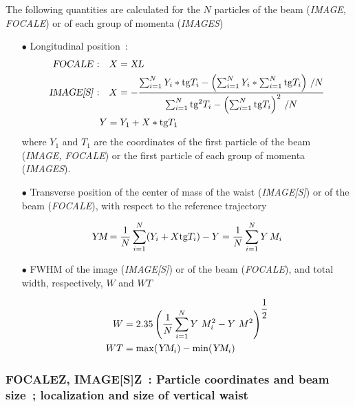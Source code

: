 \noindent The following quantities are calculated for the $ N $ particles of
the beam (\textsl{IMAGE,   FOCALE}) or of each group    of momenta 
(\textsl{IMAGES})  
\medskip

\begin{itemize}
\item[$\bullet$]Longitudinal position~: 
       \begin{align*}
       \text{\textsl{FOCALE}~:} & \quad  X=\XL  \\
       \text{\textsl{IMAGE[S]}~:} & \quad   X    = - 
    \dfrac{ \sum^ N_{i=1}Y_i\ast \text{tg} T_i- 
         \left( \sum^ N_{i=1}Y_i\ast \sum^N_{i=1}\text{tg} T_i \right)\, /N }{%
        \sum^ N_{i=1}\text{tg} ^2T_i- \left( \sum^ N_{i=1}\text{tg} T_i\right)^2\, /N} \\ 
            & Y   =   Y_1+X  \ast   \text{tg} T_1  
        \end{align*}    
where $ Y_1 $ and $ T_1 $ are the coordinates of the first particle
of the beam (\textsl{IMAGE, FOCALE}) or the first particle of each group of momenta 
(\textsl{IMAGES}). 

\item[$\bullet$]Transverse position of the center of mass of the waist 
(\textsl{IMAGE[S]}) or of the beam (\textsl{FOCALE}), with respect to the reference trajectory 

$$ \textsl{YM} = \dfrac{1 }{ N} \sum^ N_{i=1}(Y_i+X  \text{tg} T_i)-Y=
      \dfrac{1 }{ N} \sum^ N_{i=1}Y\, M_i $$

\item[$\bullet$]FWHM of the image (\textsl{IMAGE[S]}) or of the beam 
(\textsl{FOCALE}), and  total width, respectively, $ W $ and $ WT $

\begin{align*}
	W &   =     2.35 \left( \dfrac{1 }{ N} \sum^ N_{i=1}Y\ M^2_i - Y\ M^2 \right)^{\dfrac{1}{2}} \\ 
	WT &   =    \max (\textsl{YM}_i)- \min  (\textsl{YM}_i)  
\end{align*}
\end{itemize}



\newpage

\subsubsection*{FOCALEZ, IMAGE[S]Z~: Particle coordinates and beam size~;  localization and 
size  of  vertical waist}\label{FOCALEZ}\label{IMAGEZ}\label{IMAGESZ}
\medskip 
          
